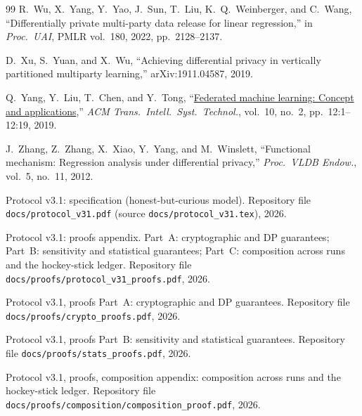\documentclass[11pt]{article}
\theoremstyle{definition}
\theoremstyle{plain}
\begin{document}
\begin{thebibliography}{99}
R.~Wu, X.~Yang, Y.~Yao, J.~Sun, T.~Liu, K.~Q.~Weinberger, and C.~Wang,
``Differentially private multi-party data release for linear regression,''
in \textit{Proc.\ UAI}, PMLR vol.~180, 2022, pp.\ 2128--2137.

D.~Xu, S.~Yuan, and X.~Wu,
``Achieving differential privacy in vertically partitioned multiparty learning,''
arXiv:1911.04587, 2019.

Q.~Yang, Y.~Liu, T.~Chen, and Y.~Tong,
``\href{https://dl.acm.org/doi/10.1145/3298981}{Federated machine learning: Concept and applications},''
\textit{ACM Trans.\ Intell.\ Syst.\ Technol.}, vol.~10, no.~2, pp.\ 12:1--12:19, 2019.

J.~Zhang, Z.~Zhang, X.~Xiao, Y.~Yang, and M.~Winslett,
``Functional mechanism: Regression analysis under differential privacy,''
\textit{Proc.\ VLDB Endow.}, vol.~5, no.~11, 2012.

Protocol v3.1: specification (honest-but-curious model).
Repository file \texttt{docs/protocol\_v31.pdf} (source \texttt{docs/protocol\_v31.tex}), 2026.

Protocol v3.1: proofs appendix. Part~A: cryptographic and DP guarantees; Part~B: sensitivity and statistical guarantees; Part~C: composition across runs and the hockey-stick ledger.
Repository file \texttt{docs/proofs/protocol\_v31\_proofs.pdf}, 2026.

Protocol v3.1, proofs Part~A: cryptographic and DP guarantees.
Repository file \texttt{docs/proofs/crypto\_proofs.pdf}, 2026.

Protocol v3.1, proofs Part~B: sensitivity and statistical guarantees.
Repository file \texttt{docs/proofs/stats\_proofs.pdf}, 2026.

Protocol v3.1, proofs, composition appendix: composition across runs and the hockey-stick ledger.
Repository file \texttt{docs/proofs/composition/composition\_proof.pdf}, 2026.

\end{thebibliography}
\end{document}
